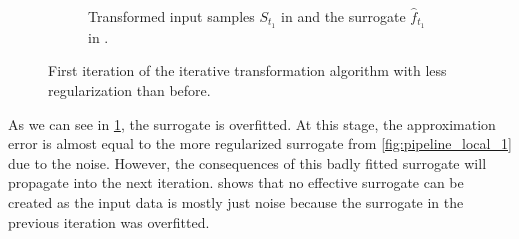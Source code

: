 \documentclass[
  a4paper,  %
  twoside,  %
  bibliography=totoc,
  headsepline,
  cleardoublepage=empty,
  parskip=half,
  draft=false
]{scrbook}
\begin{document}
\begin{mdframed}[style=style]
\begin{figure}[H]
\begin{subfigure}{.5\textwidth}
  \caption{Transformed input samples $S_{t_1}$ in \blue and the surrogate $\hat{f}_{t_1}$ in \red.}
\label{fig:pipeline_bad_local_1}
\end{subfigure}
\delimit
\caption{First iteration of the iterative transformation algorithm with less regularization than before.}
\label{fig:pipeline_bad_1}
\end{figure}
\end{mdframed}
%
As we can see in \cref{fig:pipeline_bad_local_1}, the surrogate is overfitted.
At this stage, the approximation error is almost equal to the more regularized surrogate from \cref{fig:pipeline_local_1} due to the noise.
However, the consequences of this badly fitted surrogate will propagate into the next iteration.
 shows that no effective surrogate can be created as the input data is mostly just noise because the surrogate in the previous iteration was overfitted.
\end{document}
